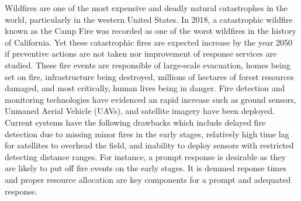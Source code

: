 \documentclass[preprint,review, 11pt,3p,authoryear]{elsarticle}
\begin{document}
Wildfires are one of the most expensive and deadly natural catastrophes in the world, particularly in the western United States. In 2018, a catastrophic wildfire known as the Camp Fire was recorded as one of the worst wildfires in the history of California. 
Yet these catastrophic fires are expected increase by the year 2050 \cite{united_nations} if preventive actions are not taken nor improvement of response services are studied. These fire events are responsible of large-scale evacuation, homes being set on fire, infrastructure being destroyed, millions of hectares of forest resources damaged, and most critically, human lives being in danger.
Fire detection and monitoring technologies have evidenced an rapid increase such as ground sensors, Unmaned Aerial Vehicle (UAVs), and satellite imagery have been deployed.
Current systems have the following drawbacks which include delayed fire detection due to missing minor fires in the early stages, relatively high time lag for satellites to overhead the field, and inability to deploy sensors with restricted detecting distance ranges. For instance, a prompt response is desirable as they are likely to put off fire events on the early stages. It is demmed reponse times and proper resource allocation are key components for a prompt and adequated response.
\end{document}
